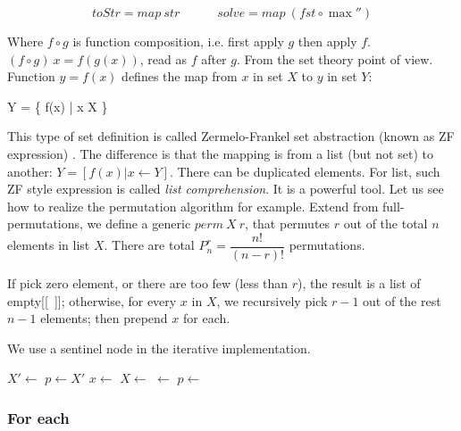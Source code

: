 \documentclass[b5paper]{article}
\begin{document}
\[
\textstyle
toStr = map\ str \quad \quad \quad
solve = map\ (fst \circ \max'')
\]

Where $f \circ g$ is function composition, i.e. first apply $g$ then apply $f$. $(f \circ g)\ x = f(g(x))$, read as $f$ after $g$. From the set theory point of view. Function $y = f(x)$ defines the map from $x$ in set $X$ to $y$ in set $Y$:

\be
Y = \{ f(x) | x \in X \}
\ee

  \label{sec:zf-expr}
This type of set definition is called Zermelo-Frankel set abstraction (known as ZF expression) \cite{algo-fp}. The difference is that the mapping is from a list (but not set) to another: $Y = [f(x) | x \gets Y]$. There can be duplicated elements. For list, such ZF style expression is called {\em list comprehension}. It is a powerful tool. Let us see how to realize the permutation algorithm for example. Extend from full-permutations\cite{algo-fp}\cite{erlang}, we define a generic $perm\ X\ r$, that permutes $r$ out of the total $n$ elements in list $X$. There are total $P_n^r = \dfrac{n!}{(n-r)!}$ permutations.

\be
{}
\ee

If pick zero element, or there are too few (less than $r$), the result is a list of empty[[\ ]]; otherwise, for every $x$ in $X$, we recursively pick $r-1$ out of the rest $n-1$ elements; then prepend $x$ for each.

We use a sentinel node in the iterative  implementation.

\begin{algorithmic}[1]
  \State $X' \gets$  
  \State $p \gets X'$
    \State $x \gets$ 
    \State $X \gets$ 
    \State {} $\gets$ 
    \State $p \gets$ 
  \EndWhile
  \State \Return {} 
\EndFunction
\end{algorithmic}

\subsubsection{For each}
\end{document}
